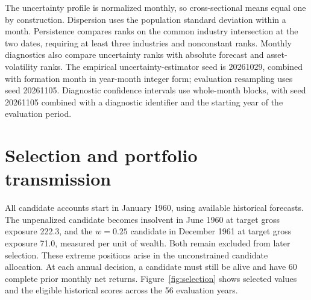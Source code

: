 The uncertainty profile is normalized monthly, so cross-sectional means equal one by construction. Dispersion uses the population standard deviation within a month. Persistence compares ranks on the common industry intersection at the two dates, requiring at least three industries and nonconstant ranks. Monthly diagnostics also compare uncertainty ranks with absolute forecast and asset-volatility ranks. The empirical uncertainty-estimator seed is 20261029, combined with formation month in year-month integer form; evaluation resampling uses seed 20261105. Diagnostic confidence intervals use whole-month blocks, with seed 20261105 combined with a diagnostic identifier and the starting year of the evaluation period.
\FloatBarrier

\section{Selection and portfolio transmission}
\label{app:holdings}
\setcounter{table}{0}\setcounter{figure}{0}
All candidate accounts start in January 1960, using available historical forecasts. The unpenalized candidate becomes insolvent in June 1960 at target gross exposure 222.3, and the $w=0.25$ candidate in December 1961 at target gross exposure 71.0, measured per unit of wealth. Both remain excluded from later selection. These extreme positions arise in the unconstrained candidate allocation. At each annual decision, a candidate must still be alive and have 60 complete prior monthly net returns. Figure~\ref{fig:selection} shows selected values and the eligible historical scores across the 56 evaluation years.

